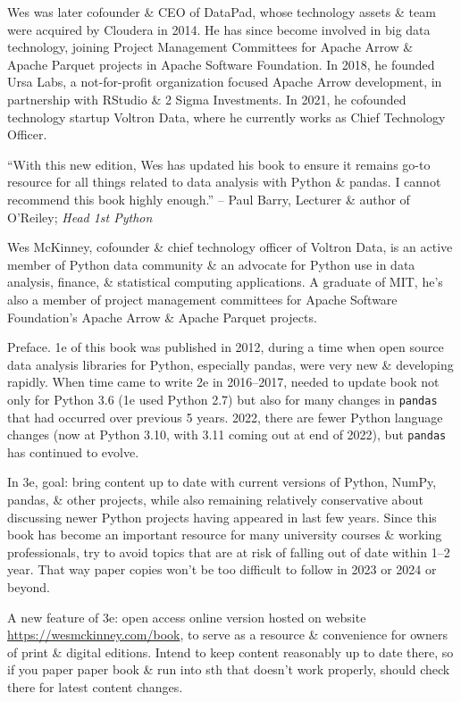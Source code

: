 \documentclass{article}
\begin{document}
\begin{enumerate}
	{\sc Wes} was later cofounder \& CEO of DataPad, whose technology assets \& team were acquired by Cloudera in 2014. He has since become involved in big data technology, joining Project Management Committees for Apache Arrow \& Apache Parquet projects in Apache Software Foundation. In 2018, he founded Ursa Labs, a not-for-profit organization focused Apache Arrow development, in partnership with RStudio \& 2 Sigma Investments. In 2021, he cofounded technology startup Voltron Data, where he currently works as Chief Technology Officer.
	
	``With this new edition, {\sc Wes} has updated his book to ensure it remains go-to resource for all things related to data analysis with Python \& pandas. I cannot recommend this book highly enough.'' -- {\sc Paul Barry}, Lecturer \& author of O'Reiley; {\it Head 1st Python}
	
	{\sc Wes McKinney}, cofounder \& chief technology officer of Voltron Data, is an active member of Python data community \& an advocate for Python use in data analysis, finance, \& statistical computing applications. A graduate of MIT, he's also a member of project management committees for Apache Software Foundation's Apache Arrow \& Apache Parquet projects.
	
	{\sf Preface.} 1e of this book was published in 2012, during a time when open source data analysis libraries for Python, especially pandas, were very new \& developing rapidly. When time came to write 2e in 2016--2017, needed to update book not only for Python 3.6 (1e used Python 2.7) but also for many changes in {\tt pandas} that had occurred over previous 5 years. 2022, there are fewer Python language changes (now at Python 3.10, with 3.11 coming out at end of 2022), but {\tt pandas} has continued to evolve.
	
	In 3e, goal: bring content up to date with current versions of Python, NumPy, pandas, \& other projects, while also remaining relatively conservative about discussing newer Python projects having appeared in last few years. Since this book has become an important resource for many university courses \& working professionals, try to avoid topics that are at risk of falling out of date within 1--2 year. That way paper copies won't be too difficult to follow in 2023 or 2024 or beyond.
	
	A new feature of 3e: open access online version hosted on website \url{https://wesmckinney.com/book}, to serve as a resource \& convenience for owners of print \& digital editions. Intend to keep content reasonably up to date there, so if you paper paper book \& run into sth that doesn't work properly, should check there for latest content changes.
	

\end{enumerate}
\end{document}
